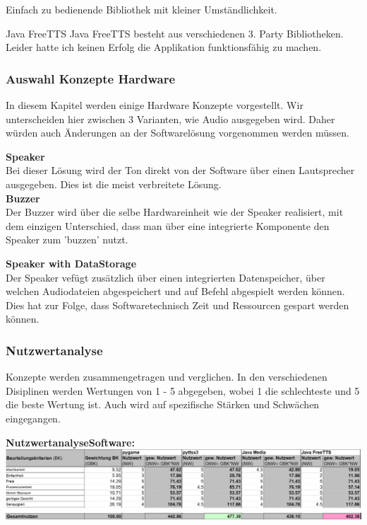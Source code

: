 \documentclass[../../../main.tex]{subfiles}
\begin{document}
    Einfach zu bedienende Bibliothek mit kleiner Umständlichkeit.

    \textbf{}{Java FreeTTS}
    Java FreeTTS besteht aus verschiedenen 3. Party Bibliotheken.
    Leider hatte ich keinen Erfolg die Applikation funktionsfähig zu machen.

    \subsubsection{Auswahl Konzepte Hardware}
    In diesem Kapitel werden einige Hardware Konzepte vorgestellt.
    Wir unterscheiden hier zwischen 3 Varianten, wie Audio ausgegeben wird.
    Daher würden auch Änderungen an der Softwarelösung vorgenommen werden müssen.

    \textbf{Speaker}\\
    Bei dieser Lösung wird der Ton direkt von der Software über einen Lautsprecher ausgegeben.
    Dies ist die meist verbreitete Lösung.\\

    \textbf{Buzzer}\\
    Der Buzzer wird über die selbe Hardwareinheit wie der Speaker realisiert, mit dem einzigen
    Unterschied, dass man über eine integrierte Komponente den Speaker zum 'buzzen' nutzt.

    \textbf{Speaker with DataStorage}\\
    Der Speaker vefügt zusätzlich über einen integrierten Datenspeicher, über welchen Audiodateien abgespeichert
    und auf Befehl abgespielt werden können. Dies hat zur Folge, dass Softwaretechnisch Zeit und Ressourcen gespart werden können.

    \subsubsection{Nutzwertanalyse}
    Konzepte werden zusammengetragen und verglichen.
    In den verschiedenen Disiplinen werden Wertungen von 1 - 5 abgegeben, wobei 1 die schlechteste und 5 die beste Wertung ist.
    Auch wird auf spezifische Stärken und Schwächen eingegangen.

    \textbf{NutzwertanalyseSoftware:}\\
    \includegraphics{Akustik/NutzwertanalyseAkustikSoftware}
\end{document}
